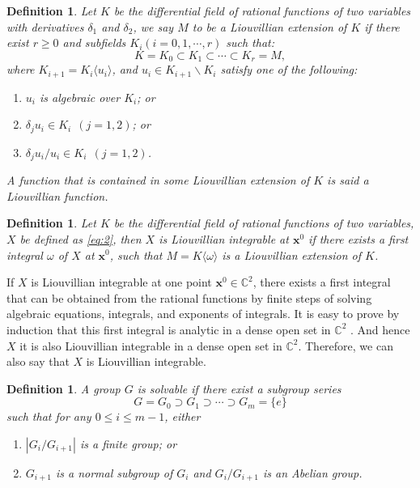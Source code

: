 \documentclass[preprint, 12pt]{elsarticle}
\newtheorem{defn}[thm]{Definition}
\numberwithin{equation}{section}
\newcommand{\Comp}{\mathbb{C}}
\begin{document}
\begin{defn}
\label{def:3} Let $K$ be the differential field of rational
functions of two variables with derivatives $\delta_1$ and
$\delta_2$, we say $M$ to be a \textit{Liouvillian extension} of
$K$ if there exist $r \geq 0$ and subfields $K_i(i = 0,1,\cdots,
r)$ such that:
$$K = K_0 \subset K_1\subset\cdots\subset K_r = M,$$
where $K_{i+1} = K_i \langle u_i \rangle$, and $u_i\in
K_{i+1}\backslash K_i$ satisfy one of the following:
\begin{enumerate}
  \item $u_i$ is algebraic over $K_i$; or
  \item $\delta_ju_i\in K_i\ \ (j = 1,2)$; or
  \item $\delta_j u_i/u_i\in K_i\ \ (j = 1,2)$.
\end{enumerate}
A function that is contained in some Liouvillian extension of $K$ is
said a \textit{Liouvillian function}.
\end{defn}
\begin{defn}
\label{def:1}Let $K$ be the differential field of rational
functions of two variables, $X$ be defined as \eqref{eq:2}, then
$X$ is \textit{Liouvillian integrable at
$\mathbf{x}^0$} if there exists a first integral $\omega$ of $X$
at $\mathbf{x}^0$, such that $M =K\langle \omega\rangle$ is a
Liouvillian extension of $K$.
\end{defn}

If $X$ is Liouvillian integrable at one point $\mathbf{x}^0\in
\Comp^2$, there exists a first integral that can be obtained from the
rational functions by finite steps of solving algebraic equations, integrals, and exponents of integrals. It is easy to prove by induction that this first integral is analytic in a
dense open set in $\Comp^2$ \cite{S:92}. And hence $X$ it
is also Liouvillian integrable in a dense open set in $\Comp^2$.
Therefore, we can also say that $X$ is Liouvillian integrable.

\begin{defn}
\label{def:2}A group $G$ is \textit{solvable} if there exist a
subgroup series
$$G = G_0\supset G_1\supset\cdots\supset G_m = \{e\}$$
such that for any $0\leq i\leq m-1$, either
\begin{enumerate}
\item $|G_{i}/G_{i+1}|$ is a finite group; or \item $G_{i+1}$ is a
normal subgroup of $G_i$ and $G_i/G_{i+1}$ is an Abelian group.
\end{enumerate}
\end{defn}
\end{document}
